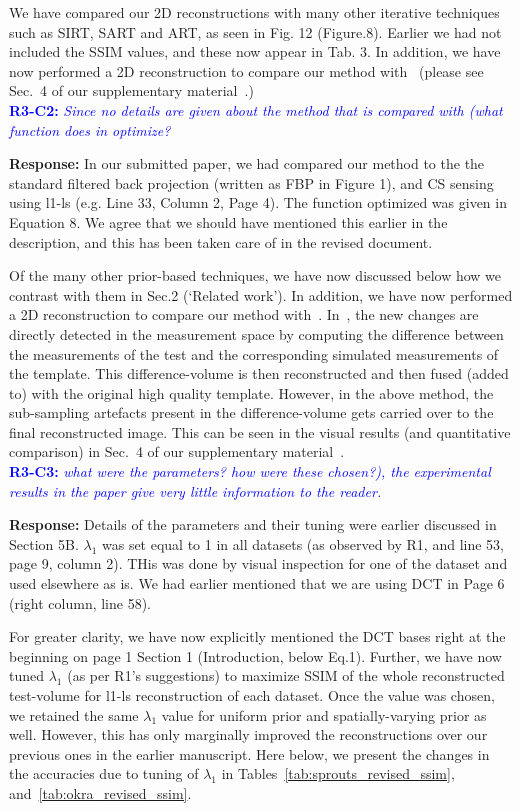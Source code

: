 \documentclass{article}
\begin{document}
We have compared our 2D reconstructions with many other iterative techniques such as SIRT, SART and ART, as seen in Fig. 12 (Figure.8). Earlier we had not included the SSIM values,  and these now appear in Tab. 3.  In addition, we have now performed a 2D reconstruction to compare our method with~\cite{Lee2012} (please see Sec.~4 of our supplementary material~\cite{supp_paper}.)\\

\textcolor{blue}{\textbf{R3-C2:}\textit{ Since no details are given about the method that is compared with (what function does in optimize?}}

\textbf{ Response:} In our submitted paper, we had compared our method to the the standard filtered back projection (written as FBP in Figure 1), and CS sensing using l1-ls (e.g. Line 33, Column 2, Page 4). The function optimized was given in Equation 8. We agree that we should have mentioned this earlier in the description, and this has been taken care of in the revised document. 

Of the many other prior-based techniques, we have now discussed  below how we contrast with them in Sec.2 (`Related work'). In addition, we have now performed a 2D reconstruction to compare our method with~\cite{Lee2012}. In~\cite{Lee2012}, the new changes are directly detected in the measurement space by computing the difference between the measurements of the test and the corresponding simulated measurements of the template. This difference-volume is then reconstructed and then fused (added to) with the original high quality template.
However, in the above method, the sub-sampling artefacts present in the difference-volume gets carried over to the final reconstructed image. This can be seen in the visual results (and quantitative comparison) in Sec.~4 of our supplementary material~\cite{supp_paper}.\\


\textcolor{blue}{\textbf{R3-C3:}\textit{ what were the parameters? how were these chosen?), the experimental results in the paper give very little information to the reader.}}

\textbf{ Response:} Details of the parameters and their tuning were earlier discussed in Section 5B. $\lambda_1$ was set equal to 1 in all datasets (as observed by R1, and line 53, page 9, column 2).  THis was done by visual inspection for one of the dataset and used elsewhere as is. We had earlier mentioned that we are using DCT in Page 6 (right column, line 58). 

For greater clarity, we have now explicitly mentioned the DCT bases right at the beginning on page 1 Section 1 (Introduction, below Eq.1).  Further, we have now tuned $\lambda_1$ (as per R1's suggestions) to maximize SSIM of the whole reconstructed test-volume for l1-ls reconstruction of each dataset. Once the value was chosen, we retained the same $\lambda_1$ value for uniform prior and spatially-varying prior as well. However, this has only marginally improved the reconstructions over our previous ones in the earlier manuscript. Here below, we present the changes in the accuracies due to tuning of $\lambda_1$ in Tables~\ref{tab:sprouts_revised_ssim}, and~\ref{tab:okra_revised_ssim}.
\end{document}
